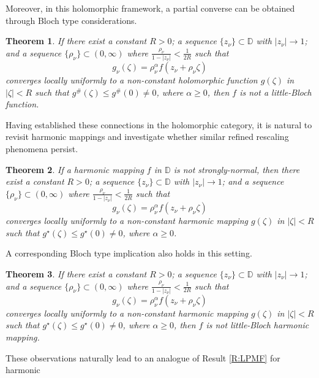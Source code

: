 \documentclass[11pt, reqno]{amsart}
\newtheorem{theorem}{Theorem}[section]
\theoremstyle{definition}
\theoremstyle{remark}
\numberwithin{equation}{section}
\begin{document}
Moreover, in this holomorphic framework, a partial converse can be obtained through Bloch type considerations.
\begin{theorem} \label{T:CPZPSNHF}
    If there exist a constant $R>0$; a sequence $\{z_{\nu}\}\subset \mathbb D$ with 
    $|z_{\nu}|\to1$; and a sequence $\{\rho_{\nu} \}\subset (0,\infty)$ where 
    $\displaystyle\frac{\rho_{\nu} }{1-|z_{\nu}|}<\frac{1}{2R}$ such that \begin{equation*}g_{\nu}(\zeta)=\rho_{\nu} ^{\alpha}f(z_{\nu}+\rho_{\nu} \zeta)\end{equation*}
    converges locally uniformly to a non-constant holomorphic function $g(\zeta)$ in $|\zeta|<R$ 
    such that $g^\#(\zeta)\le g^\#(0)\neq 0$, where $\alpha\geq 0$, then $f$ is not a little-Bloch function.
\end{theorem}
Having established these connections in the holomorphic category, it is natural to revisit
harmonic mappings and investigate whether similar refined rescaling phenomena persist.
\begin{theorem} \label{T:FPZPSNHMF}
    If a harmonic mapping $f$ in $\mathbb D$ is not strongly-normal, then there exist a constant 
    $R>0$; a sequence $\{z_{\nu}\}\subset \mathbb D$ with $|z_{\nu}|\to1$; and a sequence $\{\rho_{\nu} \}\subset (0,\infty)$ where 
    $\displaystyle\frac{\rho_{\nu} }{1-|z_{\nu}|}<\frac{1}{2R}$ such that \begin{equation*}g_{\nu}(\zeta)=\rho_{\nu} ^{\alpha}f(z_{\nu}+\rho_{\nu} \zeta)\end{equation*}
    converges locally uniformly to a non-constant harmonic mapping $g(\zeta)$ in $|\zeta|<R$ such 
    that $g^\star(\zeta)\le g^\star(0)\neq 0$, where $\alpha\geq 0$.
\end{theorem}
A corresponding Bloch type implication also holds in this setting.
\begin{theorem} \label{T:CPZPSNHMF}  
    If there exist a constant $R>0$; a sequence $\{z_{\nu}\}\subset \mathbb D$ with 
    $|z_{\nu}|\to1$; and a sequence $\{\rho_{\nu} \}\subset (0,\infty)$ where $\displaystyle\frac{\rho_{\nu} }{1-|z_{\nu}|}<\frac{1}{2R}$ such that \begin{equation*}g_{\nu}(\zeta)=\rho_{\nu} ^{\alpha}f(z_{\nu}+\rho_{\nu} \zeta)\end{equation*}
    converges locally uniformly to a non-constant harmonic mapping $g(\zeta)$ in $|\zeta|<R$ such 
    that $g^\star(\zeta)\le g^\star(0)\neq 0$, where $\alpha\geq 0$, then $f$ is not little-Bloch harmonic mapping.
\end{theorem}  These observations naturally lead to an analogue of Result \ref{R:LPMF} for harmonic 
\end{document}
